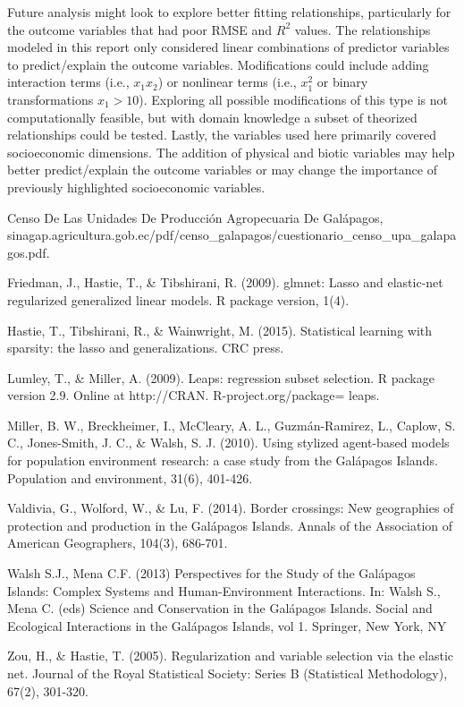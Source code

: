 \documentclass{article}
\begin{document}
Future analysis might look to explore better fitting relationships, particularly for the outcome variables that had poor RMSE and $R^2$ values. The relationships modeled in this report only considered linear combinations of predictor variables to predict/explain the outcome variables. Modifications could include adding interaction terms (i.e., $x_1x_2$) or nonlinear terms (i.e., $x_1^2$ or binary transformations $x_1 > 10$). Exploring all possible modifications of this type is not computationally feasible, but with domain knowledge a subset of theorized relationships could be tested. Lastly, the variables used here primarily covered socioeconomic dimensions. The addition of physical and biotic variables may help better predict/explain the outcome variables or may change the importance of previously highlighted socioeconomic variables.


\medskip

\small

\begin{thebibliography}{99}

 Censo De Las Unidades De Producci\'on Agropecuaria De Gal\'apagos, sinagap.agricultura.gob.ec/pdf/censo\_galapagos/cuestionario\_censo\_upa\_galapagos.pdf.

 Friedman, J., Hastie, T., \& Tibshirani, R. (2009). glmnet: Lasso and elastic-net regularized generalized linear models. R package version, 1(4).

 Hastie, T., Tibshirani, R., \& Wainwright, M. (2015). Statistical learning with sparsity: the lasso and 
generalizations. CRC press.

 Lumley, T., \& Miller, A. (2009). Leaps: regression subset selection. R package version 2.9. Online at http://CRAN. R-project.org/package= leaps.

 Miller, B. W., Breckheimer, I., McCleary, A. L., Guzm\'an-Ramirez, L., Caplow, S. C., Jones-Smith, J. C., \& Walsh, S. J. (2010). Using stylized agent-based models for population environment research: a case study from the Gal\'apagos Islands. Population and environment, 31(6), 401-426.

Valdivia, G., Wolford, W., \& Lu, F. (2014). Border crossings: New geographies of protection and production in the Gal\'apagos Islands. Annals of the Association of American Geographers, 104(3), 686-701.

 Walsh S.J., Mena C.F. (2013) Perspectives for the Study of the Gal\'apagos Islands: Complex Systems and Human-Environment Interactions. In: Walsh S., Mena C. (eds) Science and Conservation in the Gal\'apagos Islands. Social and Ecological Interactions in the Gal\'apagos Islands, vol 1. Springer, New York, NY

 Zou, H., \& Hastie, T. (2005). Regularization and variable selection via the elastic net. Journal of the Royal Statistical Society: Series B (Statistical Methodology), 67(2), 301-320.




\end{thebibliography}
\end{document}

